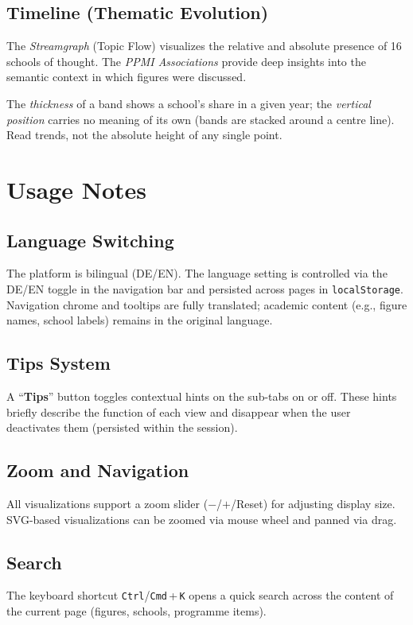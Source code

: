 \documentclass[11pt,a4paper,twoside]{article}
\begin{document}
\subsection{Timeline (Thematic Evolution)}
The \textit{Streamgraph} (Topic Flow) visualizes the relative and absolute presence of 16 schools of thought. The \textit{PPMI Associations} provide deep insights into the semantic context in which figures were discussed.

\begin{lesehilfe}
\rmfamily The \emph{thickness} of a band shows a school's share in a given year; the \emph{vertical position} carries no meaning of its own (bands are stacked around a centre line). Read trends, not the absolute height of any single point.
\end{lesehilfe}

\section{Usage Notes}
\subsection{Language Switching}
The platform is bilingual (DE/EN). The language setting is controlled via the DE/EN toggle in the navigation bar and persisted across pages in \texttt{localStorage}. Navigation chrome and tooltips are fully translated; academic content (e.g., figure names, school labels) remains in the original language.

\subsection{Tips System}
A ``\textbf{Tips}'' button toggles contextual hints on the sub-tabs on or off. These hints briefly describe the function of each view and disappear when the user deactivates them (persisted within the session).

\subsection{Zoom and Navigation}
All visualizations support a zoom slider ($-$/$+$/Reset) for adjusting display size. SVG-based visualizations can be zoomed via mouse wheel and panned via drag.

\subsection{Search}
The keyboard shortcut \texttt{Ctrl}/\texttt{Cmd}\,+\,\texttt{K} opens a quick search across the content of the current page (figures, schools, programme items).
\end{document}
